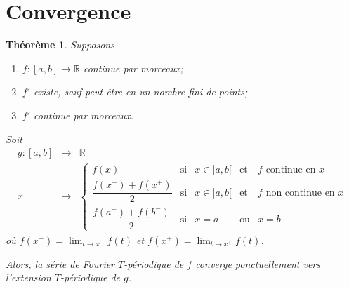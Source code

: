 \documentclass{report}
\newcommand*{\dlim}[3]{\displaystyle\lim_{#1 \to #2}#3}
\newcommand*{\reels}{\mathbb{R}}
\newtheorem*{thm}{Th\'eor\`eme}
\theoremstyle{definition}
\theoremstyle{remark}
\begin{document}
	\section{Convergence}
	\begin{thm}
		Supposons
		\begin{enumerate}[label=\roman*)]
			\item $f:[a,b] \to \reels$ continue par morceaux;
			\item $f'$ existe, sauf peut-\^etre en un nombre fini de points;
			\item $f'$ continue par morceaux.
		\end{enumerate}

		Soit
		\begin{equation*}
			\begin{array}{rcl}
				g:[a,b]&\to&\reels\\
				x&\mapsto&\left\{\begin{array}{rllll}
					f(x)&\text{si}&x \in ]a,b[&\text{et}&\text{$f$ continue en $x$}\\
					\dfrac{f(x^-)+f(x^+)}{2}&\text{si}&x \in ]a,b[&\text{et}&\text{$f$ non continue en $x$}\\
					\dfrac{f(a^+)+f(b^-)}{2}&\text{si}&x=a&\text{ou}&x=b
				\end{array}\right.
			\end{array}
		\end{equation*}
		o\`u $f(x^-) = \dlim{t}{x^-}{f(t)}$ et $f(x^+) = \dlim{t}{x^+}{f(t)}$.

		Alors, la s\'erie de Fourier $T$-p\'eriodique de $f$ converge ponctuellement vers l'extension $T$-p\'eriodique de $g$.
	\end{thm}
\end{document}
